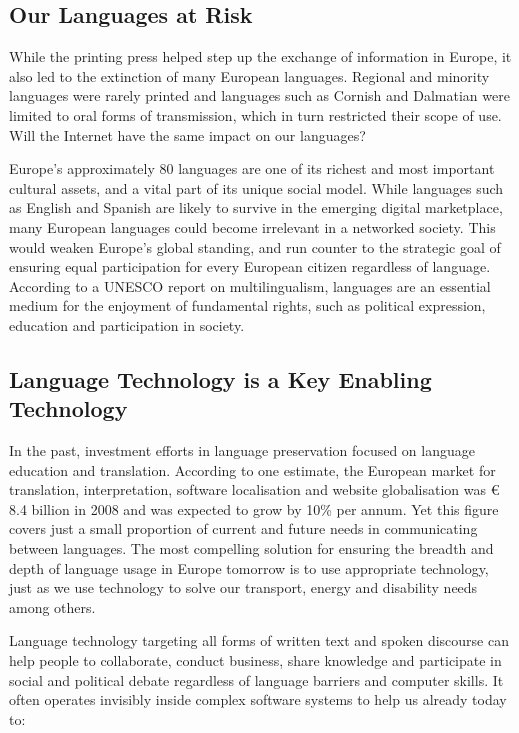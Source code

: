 \documentclass[]{../metanetpaper}
\begin{document}
\begin{multicols}{2}
\subsection{Our Languages at Risk}

While the printing press helped step up the exchange of information in Europe, it also led to the extinction of many European languages. Regional and minority languages were rarely printed and languages such as Cornish and Dalmatian were limited to oral forms of transmission, which in turn restricted their scope of use. Will the Internet have the same impact on our languages?


 Europe’s approximately 80 languages are one of its richest and most important cultural assets, and a vital part of its unique social model\cite{EC2}. While languages such as English and Spanish are likely to survive in the emerging digital marketplace, many European languages could become irrelevant in a networked society. This would weaken Europe’s global standing, and run counter to the strategic goal of ensuring equal participation for every European citizen regardless of language. According to a UNESCO report on multilingualism, languages are an essential medium for the enjoyment of fundamental rights, such as political expression, education and participation in society\cite{Unesco1}.

\subsection{Language Technology is a Key Enabling Technology}

  In the past, investment efforts in language preservation focused on language education and translation. According to one estimate, the  European market for translation, interpretation, software localisation and website globalisation was € 8.4 billion in 2008 and was expected to grow by 10\% per annum\cite{EC3}. Yet this figure covers just a small proportion of current and future needs in communicating between languages. The most compelling solution for ensuring the breadth and depth of language usage in Europe tomorrow is to use appropriate technology, just as we use technology to solve our transport, energy and disability needs among others.

Language technology targeting all forms of written text and spoken discourse can help people to collaborate, conduct business, share knowledge and participate in social and political debate regardless of language barriers and computer skills. It often operates invisibly inside complex software systems to help us already today to:


\end{multicols}
\end{document}

